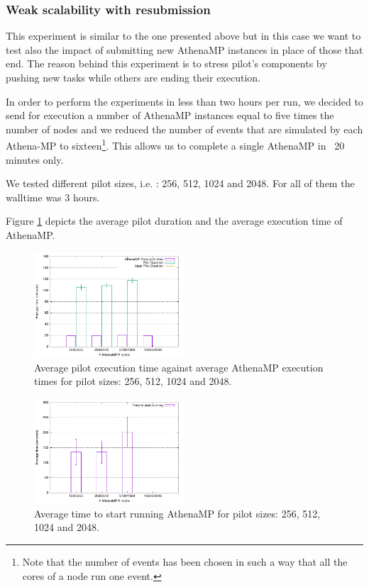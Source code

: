 \subsubsection{Weak scalability with resubmission }
This experiment is similar to the one presented above but in this case we want to test also the impact of submitting new AthenaMP instances in place of those that end. The reason behind this experiment is to stress pilot's components by pushing new tasks while others are ending their execution.

In order to perform the experiments in less than two hours per run, we decided to send for execution a number of AthenaMP instances equal to five times the number of nodes and we reduced  the number of events that are simulated by each Athena-MP to sixteen\footnote{Note that the number of events has been chosen in such a way that all the cores of a node run one event.}. This allows us to complete a single AthenaMP in ~20 minutes only. 

We tested different pilot sizes, i.e. : 256, 512, 1024 and 2048. For all of them the walltime was 3 hours. 

Figure \ref{fig:weakScal2a} depicts the average pilot duration and  the average execution time of AthenaMP.  

\begin{figure}[!htb]
        \includegraphics[width=0.5\textwidth]{./figures/NGE/weakET2.pdf}
    \caption{Average pilot execution time against average AthenaMP execution times  for pilot sizes: 256, 512, 1024 and 2048.}
\label{fig:weakScal2a}
\end{figure}
\begin{figure}[!htb]
        \includegraphics[width=0.5\textwidth]{./figures/NGE/weakStart2.pdf}
    \caption{Average time to start running AthenaMP for pilot sizes: 256, 512, 1024 and 2048.}
\label{fig:weakScal2b}
\end{figure}
